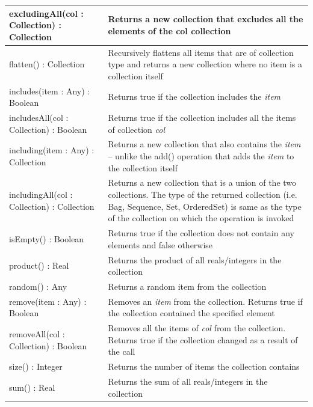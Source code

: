 \begin{longtabu} {|p{6.5cm}|X|}
    excludingAll(col : Collection) : Collection & Returns a new collection that excludes all the elements of the col collection \\\hline
    
    flatten() : Collection & Recursively flattens all items that are of collection type and returns a new collection where no item is a collection itself \\\hline
    
    includes(item : Any) : Boolean & Returns true if the collection includes the \emph{item} \\\hline
    
    includesAll(col : Collection) : Boolean & Returns true if the collection includes all the items of collection \emph{col} \\\hline
    
    including(item : Any) : Collection & Returns a new collection that also contains the \emph{item} -- unlike the add() operation that adds the \emph{item} to the collection itself  \\\hline
    
    includingAll(col : Collection) : Collection & Returns a new collection that is a union of the two collections. The type of the returned collection (i.e. Bag, Sequence, Set, OrderedSet) is same as the type of the collection on which the operation is invoked \\\hline
    
    isEmpty() : Boolean & Returns true if the collection does not contain any elements and false otherwise \\\hline
    
    product() : Real & Returns the product of all reals/integers in the collection\\\hline
    
    random() : Any & Returns a random item from the collection \\\hline
    
    remove(item : Any) : Boolean & Removes an \emph{item} from the collection. Returns true if the collection contained the specified element\\\hline
    
    removeAll(col : Collection) : Boolean & Removes all the items of \emph{col} from the collection. Returns
    true if the collection changed as a result of the call \\\hline
    
    size() : Integer & Returns the number of items the collection contains \\\hline
    
    sum() : Real & Returns the sum of all reals/integers in the collection\\\hline
\end{longtabu}

